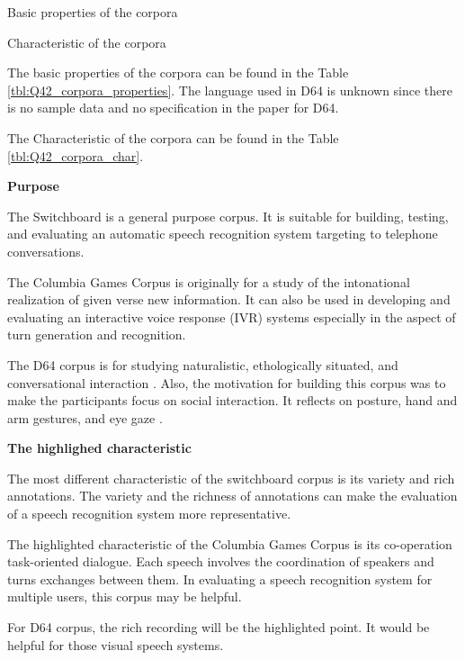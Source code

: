 \documentclass[12pt]{article}
\newenvironment{problem}[2][Problem]{\begin{trivlist}
\item[\hskip \labelsep {\bfseries #1}\hskip \labelsep {\bfseries #2.}]}{\end{trivlist}}
\begin{document}
\begin{problem}{4.2}
    \begin{table}
        \centering
        \caption{Basic properties of the corpora}
        \label{tbl:Q42_corpora_properties}    
    \end{table}

    \begin{table}
        \centering
        \caption{Characteristic of the corpora}
        \label{tbl:Q42_corpora_char}    
    \end{table}

    The basic properties of the corpora can be found in the Table \ref{tbl:Q42_corpora_properties}.
    The language used in D64 is unknown since there is no sample data and no 
    specification in the paper for D64.

    The Characteristic of the corpora can be found in the Table \ref{tbl:Q42_corpora_char}.

\noindent\textbf{Purpose}

    The Switchboard is a general purpose corpus. It is suitable for building,
    testing, and evaluating an automatic speech recognition system targeting to 
    telephone conversations. \cite{switchboard_intro}

    The Columbia Games Corpus is originally for a study of the intonational 
    realization of given verse new information. 
    It can also be used in developing and evaluating an interactive voice 
    response (IVR) systems especially in the aspect of turn generation and recognition.
    \cite{moller2007evaluating}

    The D64 corpus is for studying naturalistic, ethologically situated, and 
    conversational interaction \cite{oertel2013d64}. 
    Also,  the motivation for building this corpus was to make the participants 
    focus on social interaction. 
    It reflects on posture, hand and arm gestures, and eye gaze \cite{oertel2013d64}.

\noindent\textbf{The highlighed characteristic}
    
    The most different characteristic of the switchboard corpus is its variety 
    and rich annotations. 
    The variety and the richness of annotations can make the evaluation of 
    a speech recognition system more representative. 

    The highlighted characteristic of the Columbia Games Corpus is its 
    co-operation task-oriented dialogue. 
    Each speech involves the coordination of speakers and turns exchanges 
    between them. 
    In evaluating a speech recognition system for multiple users, 
    this corpus may be helpful.

    For D64 corpus, the rich recording will be the highlighted point.
    It would be helpful for those visual speech systems.
\end{problem}
\end{document}
